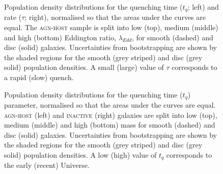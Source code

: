 \begin{figure}
\caption[Quenching time and rate population density distributions for the \textsc{agn-host} sample split by Eddington ratio]{Population density distributions for the quenching time ($t_q$; left) and rate ($\tau$; right), normalised so that the areas under the curves are equal. The \textsc{agn-host} sample is split into low (top), medium (middle) and high (bottom) Eddington ratio, $\lambda_{Edd}$, for smooth (dashed) and disc (solid) galaxies. Uncertainties from bootstrapping are shown by the shaded regions for the smooth (grey striped) and disc (grey solid) population densities. A small (large) value of $\tau$ corresponds to a rapid (slow) quench.}
\label{eddratiosplit}
\end{figure}

\begin{figure}
\caption[Quenching time population density distributions for the \textsc{agn-host} and \textsc{inactive} samples] {Population density distributions for the quenching time ($t_q$) parameter, normalised so that the areas under the curves are equal. \textsc{agn-host} (left) and \textsc{inactive} (right) galaxies are split into low (top), medium (middle) and high (bottom) mass for smooth (dashed) and disc (solid) galaxies. Uncertainties from bootstrapping are shown by the shaded regions for the smooth (grey striped) and disc (grey solid) population densities. A low (high) value of $t_q$ corresponds to the early (recent) Universe.}
\label{time}
\end{figure}


